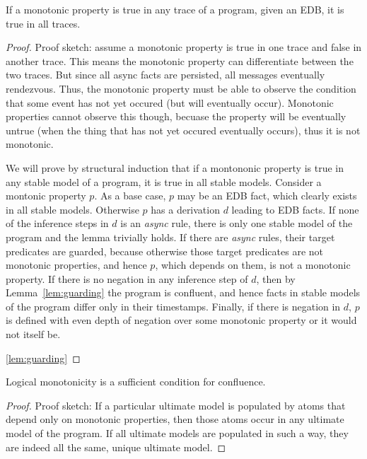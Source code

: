 \begin{lemma}
If a monotonic property is true in any trace of a program, given an EDB, it is true in all traces.
\end{lemma}
\begin{proof}
Proof sketch: assume a monotonic property is true in one trace and false in another trace.  This means the monotonic property can differentiate between the two traces.  But since all async facts are persisted, all messages eventually rendezvous.  Thus, the monotonic property must be able to observe the condition that some event has not yet occured (but will eventually occur).  Monotonic properties cannot observe this though, becuase the property will be eventually untrue (when the thing that has not yet occured eventually occurs), thus it is not monotonic.

We will prove by structural induction that if a montononic property is true in any stable
model of a \lang program, it is true in all stable models.  Consider a montonic property
$p$.  As a base case, $p$ may be an EDB fact, which clearly exists in all stable models.
Otherwise $p$ has a derivation $d$ leading to EDB facts.  If none of the inference 
steps in $d$ is an {\em async} rule, there is only one stable model of the program and
the lemma trivially holds.  If there are {\em async} rules, their target predicates are guarded,
because otherwise those target predicates are not monotonic
properties, and hence $p$, which depends on them, is not a monotonic property.  If there 
is no negation in any inference step of $d$, then by Lemma~\ref{lem:guarding} the program
is confluent, and hence facts in stable models of the program differ only in their timestamps.
Finally, if there is negation in $d$, $p$ is defined with even depth of negation over some
monotonic property or it would not itself be.  

\ref{lem:guarding}
\end{proof}

\begin{theorem}
Logical monotonicity is a sufficient condition for confluence.
\end{theorem}
\begin{proof}
Proof sketch: If a particular ultimate model is populated by atoms that depend only on monotonic properties, then those atoms occur in any ultimate model of the program.  If all ultimate models
are populated in such a way, they are indeed all the same, unique ultimate model.

\end{proof}

